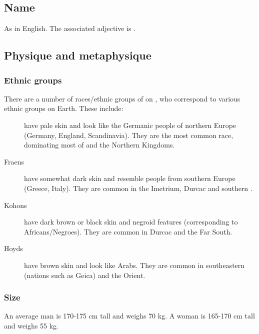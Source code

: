 \subsection{Name}
As in English. The associated adjective is \emph{\human{}}. 





\subsection{Physique and metaphysique}
\subsubsection{Ethnic groups}
There are a number of races/ethnic groups of \humans{} on \Miith{}, who correspond to various ethnic groups on Earth. These include: 

\begin{description}
  \item[{\Velcadians}] 
    have pale skin and look like the Germanic people of northern Europe (Germany, England, Scandinavia). They are the most common \human{} race, dominating most of \Velcad{} and the Northern Kingdoms. 
  \item[{Fraens}] 
    have somewhat dark skin and resemble people from southern Europe (Greece, Italy). They are common in the Imetrium, Durcac and southern \Velcad{}. 
  \item[{Kohons}] 
    have dark brown or black skin and negroid features (corresponding to Africans/Negroes). They are common in Durcac and the Far South. 
  \item[{Hoyds}] 
    have brown skin and look like Arabs. They are common in southeastern \Velcad{} (nations such as Geica) and the Orient. 
\end{description}





\subsubsection{Size}
An average \Miithian{} \human{} man is 170-175 cm tall and weighs 70 kg. A woman is 165-170 cm tall and weighs 55 kg. 





